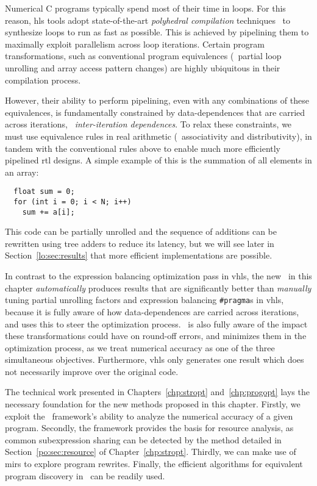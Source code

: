 Numerical C programs typically spend most of their time in loops.  For this
reason, \gls{hls} tools adopt state-of-the-art \emph{polyhedral compilation}
techniques~\cite{canis14} to synthesize loops to run as fast as possible.  This
is achieved by pipelining them to maximally exploit parallelism across loop
iterations.  Certain program transformations, such as conventional program
equivalences (\eg~partial loop unrolling and array access pattern changes) are
highly ubiquitous in their compilation process.

However, their ability to perform pipelining, even with any combinations of
these equivalences, is fundamentally constrained by data-dependences that
are carried across iterations, \ie~\emph{inter-iteration dependences}.  To
relax these constraints, we must use equivalence rules in real arithmetic
(\eg~associativity and distributivity), in tandem with the conventional rules
above to enable much more efficiently pipelined \gls{rtl} designs.  A simple
example of this is the summation of all elements in an array:
\begin{lstlisting}
  float sum = 0;
  for (int i = 0; i < N; i++)
    sum += a[i];
\end{lstlisting}
This code can be partially unrolled and the sequence of additions can be
rewritten using tree adders to reduce its latency, but we will see later in
Section~\ref{lo:sec:results} that more efficient implementations are possible.

In contrast to the expression balancing optimization pass in \gls{vhls}, the
new \soap~in this chapter \emph{automatically} produces results that are
significantly better than \emph{manually} tuning partial unrolling factors
and expression balancing \verb|#pragma|s in \gls{vhls}, because it is fully
aware of how data-dependences are carried across iterations, and uses this
to steer the optimization process. \soap~is also fully aware of the impact
these transformations could have on round-off errors, and minimizes them in
the optimization process, as we treat numerical accuracy as one of the three
simultaneous objectives.  Furthermore, \gls{vhls} only generates one result
which does not necessarily improve over the original code.

The technical work presented in Chapters~\ref{chp:stropt} and~\ref{chp:progopt}
lays the necessary foundation for the new methods proposed in this chapter.
Firstly, we exploit the \soap~framework's ability to analyze the numerical
accuracy of a given program.  Secondly, the framework provides the basis for
resource analysis, as common subexpression sharing can be detected by the
method detailed in Section~\ref{po:sec:resource} of Chapter~\ref{chp:stropt}.
Thirdly, we can make use of \glspl{mir} to explore program rewrites.  Finally,
the efficient algorithms for equivalent program discovery in \soap~can be
readily used.

